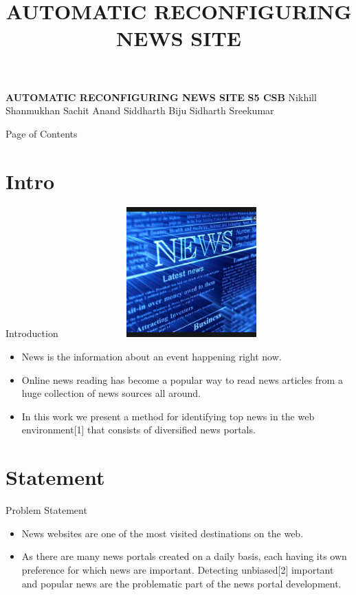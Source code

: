 \documentclass{beamer}
\title{AUTOMATIC RECONFIGURING NEWS SITE}
\begin{document}
\begin{frame}{}
\centering \textbf{ AUTOMATIC RECONFIGURING NEWS SITE} \newline \newline
\centering \textbf {           S5 CSB} \newline \newline
\centering\small Nikhill Shanmukhan \newline
\centering Sachit Anand \newline
\centering Siddharth Biju \newline
\centering Sidharth Sreekumar \newline
\end{frame}
	\begin{frame}{Page of Contents}
		\tableofcontents
	\end{frame}
	\section{Intro}
	\begin{frame}{Introduction}
	    \includegraphics[width=10cm, height=5cm]{Shot.png}
		\begin{itemize}
			\item \Large{News is the information about an event happening right now.}
		\end{itemize}
	\end{frame}
	\begin{frame}{}
	    \begin{itemize}
			\item\Large Online news reading has become a popular way to read news articles from a huge collection of news sources all around.
			\item In this work we present a method for identifying top news in the web environment[1] that consists of diversiﬁed news portals. 
		\end{itemize}
	\end{frame}
	\section{Statement}
	\begin{frame}{Problem Statement}
	    \begin{itemize}
	        \item  \Large{News websites are one of the most visited destinations on the web.}
	        \item \Large { As there are many news portals created on a daily basis, each having its own preference for which news are important. Detecting unbiased[2] important and popular news are the problematic part of the news portal development.}
	    \end{itemize}
	\end{frame}
\end{document}
